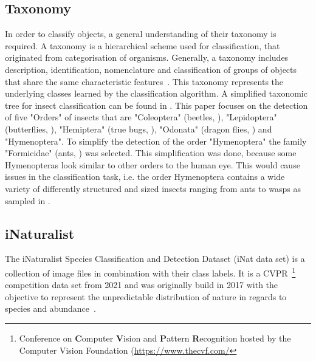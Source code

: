 \subsection{Taxonomy}\label{subsec:taxonomy}
In order to classify objects, a general understanding of their taxonomy is required.
A taxonomy is a hierarchical scheme used for classification, that originated from categorisation of organisms.
Generally, a taxonomy includes description, identification, nomenclature and classification of groups of objects that share the same characteristic features~\cite{taxonomy}.
This taxonomy represents the underlying classes learned by the classification algorithm.
A simplified taxonomic tree for insect classification can be found in .
This paper focuses on the detection of five "Orders" of insects that are "Coleoptera" (beetles, ), "Lepidoptera" (butterflies, ), "Hemiptera" (true bugs, ), "Odonata" (dragon flies, ) and "Hymenoptera".
To simplify the detection of the order "Hymenoptera" the family "Formicidae" (ants, ) was selected.
This simplification was done, because some Hymenopteras look similar to other orders to the human eye. This would cause issues in the classification task, i.e. the order Hymenoptera contains a wide variety of differently structured and sized insects ranging from ants to wasps as sampled in .

\subsection{iNaturalist}\label{subsec:inaturalist}
The iNaturalist Species Classification and Detection Dataset (iNat data set) is a collection of image files in combination with their class labels.
It is a CVPR~\footnote{Conference on \textbf{C}omputer \textbf{V}ision and \textbf{P}attern \textbf{R}ecognition hosted by the Computer Vision Foundation (\url{https://www.thecvf.com/}} competition data set from 2021 and was originally build in 2017 with the objective to represent the unpredictable distribution of nature in regards to species and abundance~\cite{iNat}.
